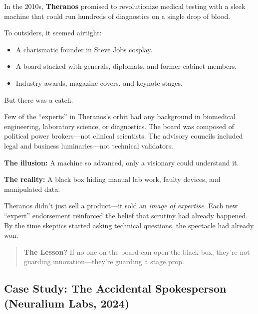 \begin{tcolorbox}[colback=blue!5!white, colframe=blue!50!black,
  title={Historical Sidebar: Theranos — When “Experts” Couldn’t Vet the Box}]

In the 2010s, \textbf{Theranos} promised to revolutionize medical testing with a sleek machine that could run hundreds of diagnostics on a single drop of blood.

To outsiders, it seemed airtight:  
\begin{itemize}
  \item A charismatic founder in Steve Jobs cosplay.
  \item A board stacked with generals, diplomats, and former cabinet members.
  \item Industry awards, magazine covers, and keynote stages.
\end{itemize}

But there was a catch.

Few of the “experts” in Theranos’s orbit had any background in biomedical engineering, laboratory science, or diagnostics.  
The board was composed of political power brokers—not clinical scientists.  
The advisory councils included legal and business luminaries—not technical validators.

\medskip

\textbf{The illusion:} A machine so advanced, only a visionary could understand it.

\textbf{The reality:} A black box hiding manual lab work, faulty devices, and manipulated data.

\medskip

Theranos didn’t just sell a product—it sold an \textit{image of expertise}.  
Each new “expert” endorsement reinforced the belief that scrutiny had already happened.  
By the time skeptics started asking technical questions, the spectacle had already won.

\medskip

\begin{quote}
\textbf{The Lesson?} If no one on the board can open the black box, they’re not guarding innovation—they’re guarding a stage prop.
\end{quote}

\end{tcolorbox}



\subsection{Case Study: The Accidental Spokesperson (Neuralium Labs, 2024)}

